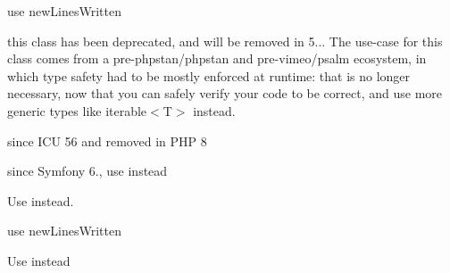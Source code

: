 \begin{DoxyRefList}
use new\+Lines\+Written  
\item[Class \doxylink{class_ramsey_1_1_uuid_1_1_provider_1_1_node_1_1_node_provider_collection}{Node\+Provider\+Collection} ]\label{deprecated__deprecated000317}%
%
this class has been deprecated, and will be removed in 5... The use-\/case for this class comes from a pre-\/{\ttfamily phpstan/phpstan} and pre-\/{\ttfamily vimeo/psalm} ecosystem, in which type safety had to be mostly enforced at runtime\+: that is no longer necessary, now that you can safely verify your code to be correct, and use more generic types like {\ttfamily iterable\texorpdfstring{$<$}{<}T\texorpdfstring{$>$}{>}} instead. 
\item[Global \doxylink{class_normalizer_ac62f1cfad2f7d0988d46057bf55d1e80}{Normalizer\+::NONE} ]\label{deprecated__deprecated000349}%
%
since ICU 56 and removed in PHP 8  
\item[Global \doxylink{class_symfony_1_1_component_1_1_http_kernel_1_1_controller_1_1_argument_resolver_1_1_not_tagged_controller_value_resolver_a6ec650d93faf4a03256428253dd7e013}{Not\+Tagged\+Controller\+Value\+Resolver\+::supports} (Request \$request, Argument\+Metadata \$argument)]\label{deprecated__deprecated000336}%
%
since Symfony 6., use  instead  
\item[Global \doxylink{class_php_option_1_1_option_a9d0bcba5d95c1924c65960f08dd5ddcf}{Option\+::if\+Defined} (\$callable)]\label{deprecated__deprecated000175}%
%
Use  instead. 
\item[Global \doxylink{class_illuminate_1_1_console_1_1_output_style_a8207469ed3a333ca774c9eb00a8ac6ee}{Output\+Style\+::new\+Line\+Written} ()]\label{deprecated__deprecated000050}%
%
use new\+Lines\+Written  
\item[Global \doxylink{class_php_parser_1_1_builder_1_1_param_aad53c1267fcd2ba2e32681d23f94cbe7}{Param\+::set\+Type\+Hint} (\$type)]\label{deprecated__deprecated000170}%
%
Use  instead  
\item[Global \doxylink{class_mockery_1_1_generator_1_1_parameter_a23ecbde357f7f6bde5a50f876334a74d}{Parameter\+::get\+Class} ()]\label{deprecated__deprecated000085}%

\end{DoxyRefList}
